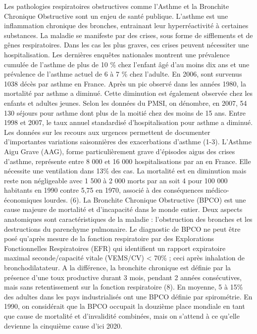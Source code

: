 \documentclass[12pt,]{article}
\begin{document}
Les pathologies respiratoires obstructives comme l'Asthme et la
Bronchite Chronique Obstructive sont un enjeu de santé publique.
L'asthme est une inflammation chronique des bronches, entrainant leur
hyperréactivité à certaines substances. La maladie se manifeste par des
crises, sous forme de sifflements et de gênes respiratoires. Dans les
cas les plus graves, ces crises peuvent nécessiter une hospitalisation.
Les dernières enquêtes nationales montrent une prévalence cumulée de
l'asthme de plus de 10 \% chez l'enfant âgé d'au moins dix ans et une
prévalence de l'asthme actuel de 6 à 7 \% chez l'adulte. En 2006, sont
survenus 1038 décès par asthme en France. Après un pic observé dans les
années 1980, la mortalité par asthme a diminué. Cette diminution est
également observée chez les enfants et adultes jeunes. Selon les données
du PMSI, on dénombre, en 2007, 54 130 séjours pour asthme dont plus de
la moitié chez des moins de 15 ans. Entre 1998 et 2007, le taux annuel
standardisé d'hospitalisation pour asthme a diminué. Les données sur les
recours aux urgences permettent de documenter d'importantes variations
saisonnières des exacerbations d'asthme (1-3). L'Asthme Aigu Grave
(AAG), forme particulièrement grave d'épisodes aigus des crises
d'asthme, représente entre 8 000 et 16 000 hospitalisations par an en
France. Elle nécessite une ventilation dans 13\% des cas. La mortalité
est en diminution mais reste non négligeable avec 1 500 à 2 000 morts
par an soit 4 pour 100 000 habitants en 1990 contre 5,75 en 1970,
associé à des conséquences médico-économiques lourdes. (6). La Bronchite
Chronique Obstructive (BPCO) est une cause majeure de mortalité et
d'incapacité dans le monde entier. Deux aspects anatomiques sont
caractéristiques de la maladie : l'obstruction des bronches et les
destructions du parenchyme pulmonaire. Le diagnostic de BPCO ne peut
être posé qu'après mesure de la fonction respiratoire par des
Explorations Fonctionnelles Respiratoires (EFR) qui identifient un
rapport expiratoire maximal seconde/capacité vitale (VEMS/CV)
\textless{} 70\% ; ceci après inhalation de bronchodilatateur. A la
différence, la bronchite chronique est définie par la présence d'une
toux productive durant 3 mois, pendant 2 années consécutives, mais sans
retentissement sur la fonction respiratoire (8). En moyenne, 5 à 15\%
des adultes dans les pays industrialisés ont une BPCO définie par
spirométrie. En 1990, on considérait que la BPCO occupait la douzième
place mondiale en tant que cause de mortalité et d'invalidité combinées,
mais on s'attend à ce qu'elle devienne la cinquième cause d'ici 2020.
\end{document}
